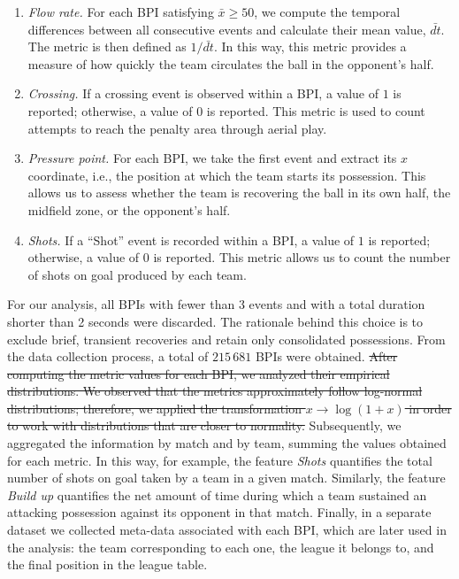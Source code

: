 \documentclass[preprint,12pt]{elsarticle}
\newcommand{\sacar}[1]{{\color{red}\sout{#1}}}
\begin{document}
\begin{enumerate}
    \item {\it Flow rate.} For each BPI satisfying $\bar{x}\geq50$, we compute the temporal differences between all consecutive events and calculate their mean value, $\bar{dt}$. The metric is then defined as $1/\bar{dt}$. In this way, this metric provides a measure of how quickly the team circulates the ball in the opponent’s half.

    \item {\it Crossing.} If a crossing event is observed within a BPI, a value of $1$ is reported; otherwise, a value of $0$ is reported. This metric is used to count attempts to reach the penalty area through aerial play.

    \item {\it Pressure point.} For each BPI, we take the first event and extract its $x$ coordinate, i.e., the position at which the team starts its possession. This allows us to assess whether the team is recovering the ball in its own half, the midfield zone, or the opponent’s half.
 
    \item {\it Shots.} If a ``Shot'' event is recorded within a BPI, a value of $1$ is reported; otherwise, a value of $0$ is reported. This metric allows us to count the number of shots on goal produced by each team.
    
\end{enumerate}

For our analysis, all BPIs with fewer than 3 events and with a total duration shorter than 2 seconds were discarded. The rationale behind this choice is to exclude brief, transient recoveries and retain only consolidated possessions.  
From the data collection process, a total of $215\,681$ BPIs were obtained.
%
\sacar{
After computing the metric values for each BPI, we analyzed their empirical distributions. 
%
We observed that the metrics approximately follow log-normal distributions; therefore, we applied the transformation $x \rightarrow \log(1+x)$ in order to work with distributions that are closer to normality.}  
%
Subsequently, we aggregated the information by match and by team, summing the values obtained for each metric. In this way, for example, the feature {\it Shots} quantifies the total number of shots on goal taken by a team in a given match.  
Similarly, the feature {\it Build up} quantifies the net amount of time during which a team sustained an attacking possession against its opponent in that match.
%  
Finally, in a separate dataset we collected meta-data associated with each BPI, which are later used in the analysis: the team corresponding to each one, the league it belongs to, and the final position in the league table.
\end{document}
